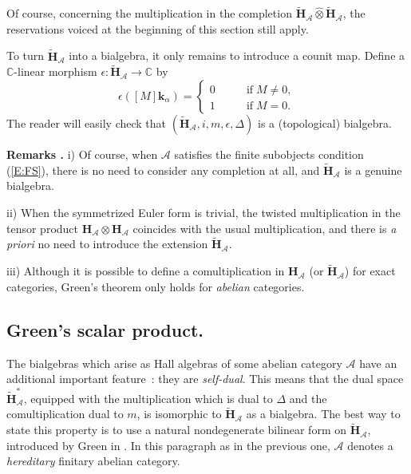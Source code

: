 \documentclass[a4paper,10pt]{amsart}
\def\H{\mathbf{H}}
\def\a{\alpha}
\def\C{\mathbb{C}}
\def\A{\mathcal{A}}
\numberwithin{equation}{section}
\begin{document}
Of course, concerning the multiplication in the completion $\widetilde{\H}_{\A} \widehat{\otimes} \widetilde{\H}_{\A}$, the reservations voiced at the beginning of this section still apply.

To turn $\widetilde{\H}_{\A}$ into a bialgebra, it only remains to introduce a counit map. Define a $\C$-linear morphism $\epsilon: \widetilde{\H}_{\A} \to \C$ by
$$
\epsilon([M]\mathbf{k}_{\a})=
\begin{cases} 0  \qquad & \text{if}\; M \neq 0,\\
1 \qquad & \text{if}\; M=0.
\end{cases}
$$
The reader will easily check that $(\widetilde{\H}_{\A}, i, m, \epsilon, {\Delta})$ is a (topological) bialgebra.

\vspace{.2in}

\addtocounter{theo}{1}
\noindent \textbf{Remarks \thetheo .} i) Of course, when $\A$ satisfies the finite subobjects condition (\ref{E:FS}), there is no need to consider any completion at all, and $\widetilde{\H}_{\A}$ is a genuine bialgebra.

\vspace{.05in}

\noindent
ii) When the symmetrized Euler form is trivial, the twisted multiplication in the tensor product $\H_{\A} \otimes \H_{\A}$ coincides with the usual multiplication, and there is \textit{a priori} no need to introduce the extension $\widetilde{\H}_{\A}$.

\vspace{.05in}

\noindent
iii) Although it is possible to define a comultiplication in $\H_{\A}$ (or $\widetilde{\H}_{\A}$) for exact categories, Green's theorem only holds for \textit{abelian} categories.

\vspace{.2in}

\subsection{Green's scalar product.}

\vspace{.15in}

The bialgebras which arise as Hall algebras of some abelian category $\A$ have an additional important feature~: they are \textit{self-dual}. This means that the dual space $\widetilde{\H}_{\A}^*$, equipped with the multiplication which is dual to $\Delta$ and the comultiplication dual to $m$, is isomorphic to $\widetilde{\H}_{\A}$ as a bialgebra. The best way to state this property is to use a natural nondegenerate bilinear form on $\widetilde{\H}_{\A}$, introduced by Green in \cite{Green}. In this paragraph as in the previous one, $\A$ denotes a \textit{hereditary} finitary abelian category.
\end{document}
